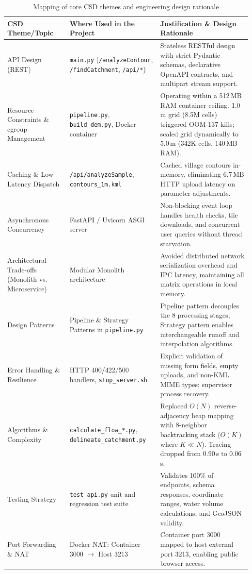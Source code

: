 \documentclass[manuscript,screen,review]{acmart}
\begin{document}
\begin{table}[t]
  \caption{Mapping of core CSD themes and engineering design rationale}
  \label{tab:csd-themes}
  \small
  \begin{tabular}{p{3.2cm}p{4.8cm}p{7.5cm}}
    \toprule
    CSD Theme/Topic & Where Used in the Project & Justification \& Design Rationale \\
    \midrule
    API Design (REST) & \texttt{main.py} (\texttt{/analyzeContour}, \texttt{/findCatchment}, \texttt{/api/*}) & Stateless RESTful design with strict Pydantic schemas, declarative OpenAPI contracts, and multipart stream support. \\
    Resource Constraints \& cgroup Management & \texttt{pipeline.py}, \texttt{build\_dem.py}, Docker container & Operating within a 512\,MB RAM container ceiling. 1.0\,m grid (8.5M cells) triggered OOM-137 kills; scaled grid dynamically to 5.0\,m (342K cells, 140\,MB RAM). \\
    Caching \& Low Latency Dispatch & \texttt{/api/analyzeSample}, \texttt{contours\_1m.kml} & Cached village contours in-memory, eliminating 6.7\,MB HTTP upload latency on parameter adjustments. \\
    Asynchronous Concurrency & FastAPI / Uvicorn ASGI server & Non-blocking event loop handles health checks, tile downloads, and concurrent user queries without thread starvation. \\
    Architectural Trade-offs (Monolith vs. Microservice) & Modular Monolith architecture & Avoided distributed network serialization overhead and IPC latency, maintaining all matrix operations in local memory. \\
    Design Patterns & Pipeline \& Strategy Patterns in \texttt{pipeline.py} & Pipeline pattern decouples the 8 processing stages; Strategy pattern enables interchangeable runoff and interpolation algorithms. \\
    Error Handling \& Resilience & HTTP 400/422/500 handlers, \texttt{stop\_server.sh} & Explicit validation of missing form fields, empty uploads, and non-KML MIME types; supervisor process recovery. \\
    Algorithms \& Complexity & \texttt{calculate\_flow\_*.py}, \texttt{delineate\_catchment.py} & Replaced $O(N)$ reverse-adjacency heap mapping with 8-neighbor backtracking stack ($O(K)$ where $K \ll N$). Tracing dropped from 0.90\,s to 0.06\,s. \\
    Testing Strategy & \texttt{test\_api.py} unit and regression test suite & Validates 100\% of endpoints, schema responses, coordinate ranges, water volume calculations, and GeoJSON validity. \\
    Port Forwarding \& NAT & Docker NAT: Container 3000 $\rightarrow$ Host 3213 & Container port 3000 mapped to host external port 3213, enabling public browser access. \\
    \bottomrule
  \end{tabular}
\end{table}
\end{document}
